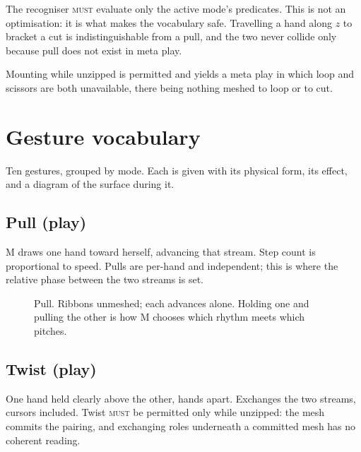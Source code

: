 \documentclass[11pt,a4paper]{article}
\newcommand{\MUST}{\textsc{must}}
\theoremstyle{definition}
\theoremstyle{plain}
\theoremstyle{remark}
\newcommand{\spools}{%
  \fill[ribL,opacity=.45,rounded corners=2pt] (1.55,5.40) rectangle (2.45,5.95);
  \fill[ribR,opacity=.45,rounded corners=2pt] (5.55,5.40) rectangle (6.45,5.95);
  \node[font=\scriptsize] at (2,6.22) {left spool};
  \node[font=\scriptsize] at (6,6.22) {right spool};
}
\newcommand{\musician}{%
  \draw[gray] (4,-0.10) circle (0.23);
  \node[font=\scriptsize] at (4,-0.10) {M};
}
\newcommand{\axes}{%
  \draw[->,gray,thin] (0.85,4.30) -- (1.45,4.30) node[right,font=\scriptsize]{$x$};
  \draw[->,gray,thin] (0.85,4.30) -- (0.85,4.90) node[above,font=\scriptsize]{$z$};
}
\newcommand{\ribbonsopen}{%
  \draw[ribL,opacity=.45,line width=16pt,line join=round]
    (2,5.40) -- (2,4.60) -- (3.10,4.00) -- (3.10,0.70);
  \draw[ribR,opacity=.45,line width=16pt,line join=round]
    (6,5.40) -- (6,4.60) -- (4.90,4.00) -- (4.90,0.70);
}
\newcommand{\handat}[2]{\filldraw[fill=white,draw=gray!80,thin] (#1,#2) circle (0.17);}
\newcommand{\handsdefault}{\handat{3.10}{0.55}\handat{4.90}{0.55}}
\begin{document}
The recogniser \MUST{} evaluate only the active mode's predicates. This is not an optimisation: it
is what makes the vocabulary safe. Travelling a hand along $z$ to bracket a cut is
indistinguishable from a pull, and the two never collide only because pull does not exist in meta
play.

Mounting while unzipped is permitted and yields a meta play in which loop and scissors are both
unavailable, there being nothing meshed to loop or to cut.

\section{Gesture vocabulary}
\label{sec:gestures}

Ten gestures, grouped by mode. Each is given with its physical form, its effect, and a diagram of
the surface during it.

\subsection{Pull \normalfont(play)}

M draws one hand toward herself, advancing that stream. Step count is proportional to speed. Pulls
are per-hand and independent; this is where the relative phase between the two streams is set.

\begin{figure}[H]\centering
{}
\caption{Pull. Ribbons unmeshed; each advances alone. Holding one and pulling the other is how M
chooses which rhythm meets which pitches.}
\end{figure}

\subsection{Twist \normalfont(play)}

One hand held clearly above the other, hands apart. Exchanges the two streams, cursors included.
Twist \MUST{} be permitted only while unzipped: the mesh commits the pairing, and exchanging roles
underneath a committed mesh has no coherent reading.
\end{document}
